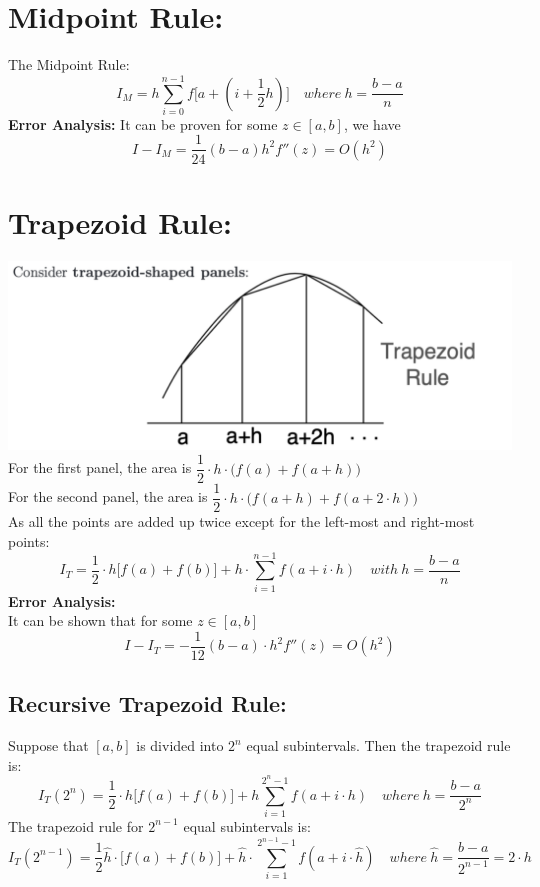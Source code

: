 \documentclass [9 pt]{article}
\theoremstyle{definition}
\begin{document}
\section*{Midpoint Rule:}
The Midpoint Rule:
$$ I_M = h \sum_{i = 0}^{n - 1} f\Big[ a + ( i + \dfrac{1}{2} h)  \Big] \quad where\ h = \dfrac{b - a}{n} $$
\textbf{Error Analysis:}
It can be proven for some $z \in [a, b]$, we have
$$I - I_M = \dfrac{1}{24} (b - a) h^2 f''(z) = O(h^2) $$

\section*{Trapezoid Rule:}
\includegraphics[scale = 0.5]{1}\\
For the first panel, the area is $\dfrac{1}{2}\cdot h \cdot \Big(  f(a) + f(a + h) \Big)$\\
For the second panel, the area is $\dfrac{1}{2}\cdot h \cdot  \Big( f(a + h) + f(a + 2 \cdot h) \Big)$\\
As all the points are added up twice except for the left-most and right-most points:
$$ I_T = \dfrac{1}{2} \cdot h \Big[ f(a) + f(b) \Big] + h \cdot \sum_{i = 1}^{n - 1} f(a + i\cdot h) \quad with\ h = \dfrac{b - a}{n}  $$
\textbf{Error Analysis:}\\
It can be shown that for some $z \in [a, b]$
$$ I - I_T = - \dfrac{1}{12} (b - a) \cdot h^2 f''(z) = O(h^2) $$

\subsection*{Recursive Trapezoid Rule:}
Suppose that $[a, b]$ is divided into $2^n$ equal subintervals. Then the trapezoid rule is:
$$ I_T(2^n) = \dfrac{1}{2} \cdot h \Big[ f(a) + f(b) \Big] + h \sum_{i = 1}^{2^n - 1} f(a + i\cdot h)\quad where\ h = \dfrac{b - a}{2^n} $$
The trapezoid rule for $2^{n - 1}$ equal subintervals is:
$$ I_T(2^{n - 1}) = \dfrac{1}{2} \widehat{h}\cdot \Big[ f(a) + f(b) \Big] + \widehat{h}\cdot \sum_{i = 1}^{2^{n-1} - 1} f(a + i\cdot \widehat{h})\quad where\ \widehat{h} = \dfrac{b - a}{2^{n - 1}} = 2 \cdot h $$
\end{document}
